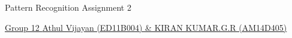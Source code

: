 \documentclass[11pt,paper=a4,answers]{exam}
\begin{document}
\noindent
\begin{minipage}[l]{.1\textwidth}%
\noindent
\end{minipage}
\hfill
\begin{minipage}[r]{.68\textwidth}%
\begin{center}
{\large \bfseries \par
\Large Pattern Recognition Assignment 2 \\[2pt]
\vspace{6pt}
\small   \par}
\end{center}
\end{minipage}
\begin{minipage}[l]{.195\textwidth}%
\noindent
{\footnotesize}
\end{minipage}
\par
\noindent
\uline{Group 12 \hfill \normalsize\emph \hfill       Athul Vijayan (ED11B004) \& KIRAN KUMAR.G.R (AM14D405)}\\
\end{document}
